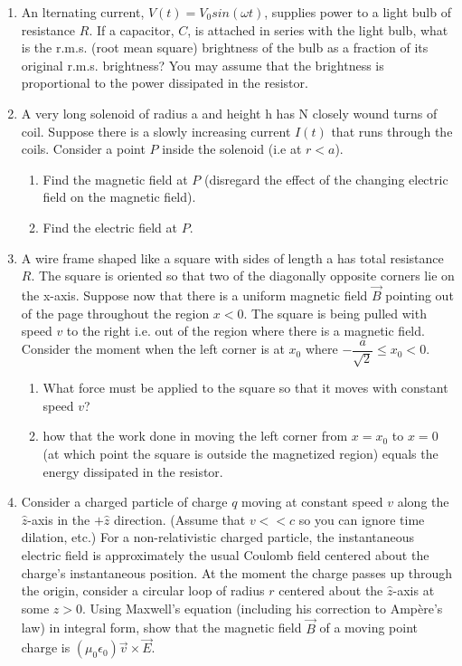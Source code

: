 \documentclass[fleqn]{article}
\begin{document}
\begin{enumerate}
    \pagebreak

    \item An lternating current, $V(t)=V_0 sin(\omega t)$, supplies power to a light bulb of resistance $R$. 
    If a capacitor, $C$, is attached in series with the light bulb, what is the r.m.s. (root mean square) 
    brightness of the bulb as a fraction of its original r.m.s. brightness? You may assume that
    the brightness is proportional to the power dissipated in the resistor.


    \item A very long solenoid of radius a and height h has N closely wound turns of coil. Suppose there is a 
    slowly increasing current $I(t)$ that runs through the coils. Consider a point $P$ inside the solenoid 
    (i.e at $r < a$).
    \begin{enumerate}
      \item Find the magnetic field at $P$ (disregard the effect of the changing
      electric field on the magnetic field).


      \item Find the electric field at $P$.
    \end{enumerate}


    \item A wire frame shaped like a square with sides of length a has total resistance $R$. The square is oriented 
    so that two of the diagonally opposite corners lie on the x-axis. Suppose now that there is a uniform
    magnetic field $\overrightarrow{B}$ pointing out of the page throughout the region $x < 0$. The square is being 
    pulled with speed $v$ to the right i.e. out of the region where there is a magnetic field. Consider the moment 
    when the left corner is at $x_0$ where $-\dfrac{a}{\sqrt{2}} \leq x_0 <0$.
    \begin{enumerate}
      \item What force must be applied to the square so that it moves with
      constant speed $v$?

      \item how that the work done in moving the left corner from $x=x_0$ to $x=0$ (at which 
      point the square is outside the magnetized region) equals the energy dissipated in the 
      resistor.
    \end{enumerate}

    \item Consider a charged particle of charge $q$ moving at constant speed $v$ along the $\hat{z}$-axis in the 
    $+ \hat{z}$ direction. (Assume that $v<<c$ so you can ignore time dilation, etc.) For a non-relativistic 
    charged particle, the instantaneous electric field is approximately the usual Coulomb field centered about 
    the charge’s instantaneous position. At the moment the charge passes up through the origin, consider a circular loop of
    radius $r$ centered about the $\hat{z}$-axis at some $z>0$. Using Maxwell’s equation (including his correction 
    to Ampère’s law) in integral form, show that the magnetic field $\overrightarrow{B}$ of a moving point charge is 
    $\left(\mu_0 \epsilon_0\right) \overrightarrow{v} \times \overrightarrow{E}$.



\end{enumerate}
\end{document}
